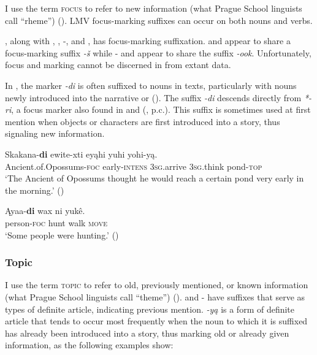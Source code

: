 \documentclass[output=paper]{LSP/langsci}
\begin{document}
I use the term \textsc{focus} to refer to new information (what Prague School linguists call “rheme”) (\citealt[271]{Payne1997}). LMV focus-marking suffixes can occur on both nouns and verbs.

	, along with , , -, and , has focus-marking suffixation.  and  appear to share a focus-marking suffix \emph{-š} while - and  appear to share the suffix \emph{-ook}. Unfortunately, focus and  marking cannot be discerned in  from extant data.

In , the marker \emph{-di} is often suffixed to nouns in texts, particularly with nouns newly introduced into the narrative or  (\citealt[3]{Kaufman2011}). The suffix \emph{-di} descends directly from  \emph{*-ri}, a focus marker also found in  and  (\citealt[3]{Boyle2007}, p.c.). This suffix is sometimes used at first mention when objects or characters are first introduced into a story, thus signaling new information. 

\ea\label{possumpond}
\gll 	Skakana-\textbf{di} ewite-xti eyąhi yuhi yohi-y\k{a}. \\
	Ancient.of.Opossums-\textsc{foc} early-\textsc{intens} \textsc{3sg}.arrive \textsc{3sg}.think pond-\textsc{top}\\
\glt `The Ancient of Opossums thought he would reach a certain pond very early in the morning.' (\citealt[26]{DorseySwanton1912})
\z

\ea
\gll	Ąyaa-\textbf{di} wax ni yukê. \\
	person-\textsc{foc} hunt walk \textsc{move}\\
\glt `Some people were hunting.' (\citealt[65]{DorseySwanton1912})
\z

\subsubsection{Topic}

I use the term \textsc{topic} to refer to old, previously mentioned, or known information (what Prague School linguists call “theme”) (\citealt[271]{Payne1997}).  and - have suffixes that serve as types of definite article, indicating previous mention.  \emph{-yą} is a form of definite article that tends to occur most frequently when the noun to which it is suffixed has already been introduced into a story, thus marking old or already given information, as the following examples show: 
\end{document}

